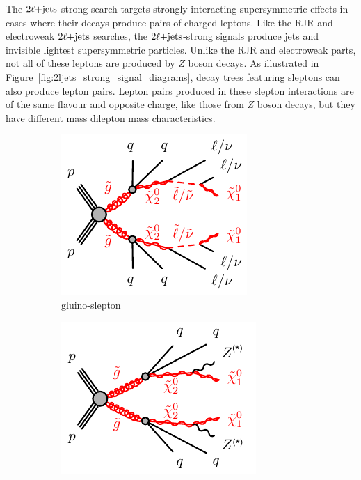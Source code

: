 The $2\ell\mathrm{+jets}$-strong search targets strongly interacting supersymmetric
effects in cases where their decays produce pairs of charged leptons.
Like the RJR and electroweak $2\ell\mathrm{+jets}$ searches, the $2\ell\mathrm{+jets}$-strong
signals produce jets and invisible lightest supersymmetric particles.
Unlike the RJR and electroweak parts, not all of these leptons are produced
by $Z$ boson decays.
As illustrated in Figure~\ref{fig:2ljets_strong_signal_diagrams}, decay trees
featuring sleptons can also produce lepton pairs.
Lepton pairs produced in these slepton interactions are of the same flavour
and opposite charge, like those from $Z$ boson decays, but they have different
mass dilepton mass characteristics.

\begin{figure}[tp]
\centering
\begin{subfigure}{0.45\textwidth}
  \centering
  \includegraphics[width=\textwidth]{figures/2ljets_strong_gogo_qqqqllllN1N1_N2.pdf}
  \caption{gluino-slepton}
\end{subfigure}
\hfill
\begin{subfigure}{0.47\textwidth}
  \centering
  \includegraphics[width=\textwidth]{figures/2ljets_strong_gogo_qqqqZZN1N1.pdf}

\end{subfigure}
\end{figure}
